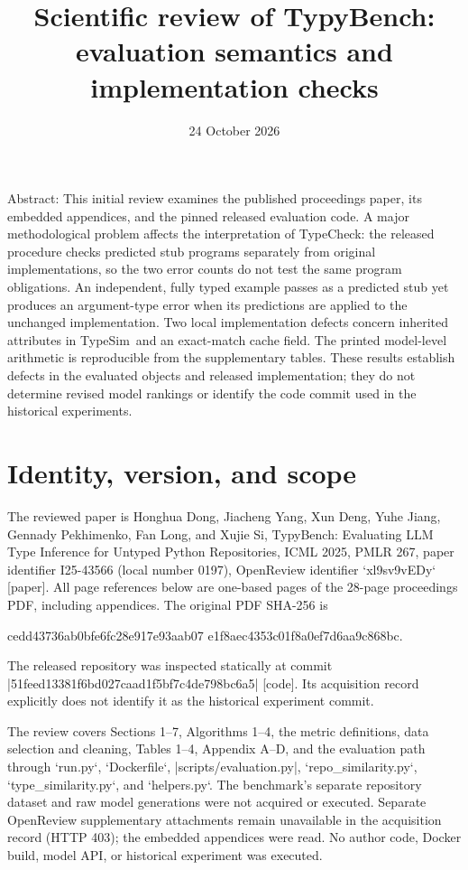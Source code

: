 \documentclass[10pt]{article}
\title{Scientific review of TypyBench:
evaluation semantics and implementation checks}
\author{}
\date{24 October 2026}
\begin{document}
\maketitle
Abstract: This initial review examines the published proceedings paper, its embedded appendices, and the pinned released evaluation code. A major methodological problem affects the interpretation of TypeCheck: the released procedure checks predicted stub programs separately from original implementations, so the two error counts do not test the same program obligations. An independent, fully typed example passes as a predicted stub yet produces an argument-type error when its predictions are applied to the unchanged implementation. Two local implementation defects concern inherited attributes in TypeSim and an exact-match cache field. The printed model-level arithmetic is reproducible from the supplementary tables. These results establish defects in the evaluated objects and released implementation; they do not determine revised model rankings or identify the code commit used in the historical experiments.\par
\section*{Identity, version, and scope}
The reviewed paper is Honghua Dong, Jiacheng Yang, Xun Deng, Yuhe Jiang, Gennady Pekhimenko, Fan Long, and Xujie Si, TypyBench: Evaluating LLM Type Inference for Untyped Python Repositories, ICML 2025, PMLR 267, paper identifier I25-43566 (local number 0197), OpenReview identifier `xl9sv9vEDy` [paper]. All page references below are one-based pages of the 28-page proceedings PDF, including appendices. The original PDF SHA-256 is\par
cedd43736ab0bfe6fc28e917e93aab07
e1f8aec4353c01f8a0ef7d6aa9c868bc.\par
The released repository was inspected statically at commit |51feed13381f6bd027caad1f5bf7c4de798bc6a5| [code]. Its acquisition record explicitly does not identify it as the historical experiment commit.\par
The review covers Sections 1–7, Algorithms 1–4, the metric definitions, data selection and cleaning, Tables 1–4, Appendix A–D, and the evaluation path through `run.py`, `Dockerfile`, |scripts/evaluation.py|, `repo\_similarity.py`, `type\_similarity.py`, and `helpers.py`. The benchmark’s separate repository dataset and raw model generations were not acquired or executed. Separate OpenReview supplementary attachments remain unavailable in the acquisition record (HTTP 403); the embedded appendices were read. No author code, Docker build, model API, or historical experiment was executed.\par
\end{document}
